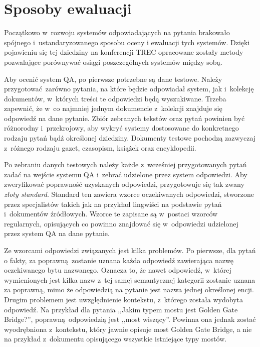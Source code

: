 \documentclass[a4paper, twoside, openright, 12pt]{report}
\begin{document}
    \section{Sposoby ewaluacji}
        Początkowo w~rozwoju systemów odpowiadających na pytania brakowało spójnego i~ustandaryzowanego sposobu oceny i
        ewaluacji tych systemów. Dzięki pojawieniu się tej dziedziny na konferencji TREC opracowane zostały metody
        pozwalające porównywać osiągi poszczególnych systemów między sobą.

        Aby ocenić system QA, po pierwsze potrzebne są dane testowe. Należy przygotować zarówno pytania, na które będzie
        odpowiadał system, jak i~kolekcję dokumentów, w~których treści te odpowiedzi będą wyszukiwane. Trzeba zapewnić,
        że w~co najmniej jednym dokumencie z~kolekcji znajduje się odpowiedź na dane pytanie. Zbiór zebranych
        tekstów oraz pytań powinien być różnorodny i~przekrojowy, aby wykryć systemy dostosowane do konkretnego
        rodzaju pytań bądź określonej dziedziny. Dokumenty testowe pochodzą zazwyczaj z~różnego rodzaju gazet, czasopism,
        książek oraz encyklopedii.

        Po zebraniu danych testowych należy każde z~wcześniej przygotowanych pytań zadać na wejście systemu QA i~zebrać
        udzielone przez system odpowiedzi. Aby zweryfikować poprawność uzyskanych odpowiedzi, przygotowuje się tak zwany
        \emph{złoty standard}. Standard ten zawiera wzorce oczekiwanych odpowiedzi, stworzone przez specjalistów takich
        jak na przykład lingwiści na podstawie pytań i~dokumentów źródłowych. Wzorce te zapisane są w~postaci wzorców
        regularnych, opisujących co powinno znajdować się w~odpowiedzi udzielonej przez system QA na dane pytanie.

        Ze wzorcami odpowiedzi związanych jest kilka problemów. Po pierwsze, dla pytań o fakty, za poprawną zostanie
        uznana każda odpowiedź zawierająca nazwę oczekiwanego bytu nazwanego. Oznacza to, że nawet odpowiedź, w~której
        wymienionych jest kilka nazw z~tej samej semantycznej kategorii zostanie uznana za poprawną, mimo że odpowiedzią
        na pytanie jest nazwa jednej określonej encji. Drugim problemem jest uwzględnienie kontekstu, z~którego została
        wydobyta odpowiedź. Na przykład dla pytania ,,Jakim typem mostu jest Golden Gate Bridge?'', poprawną odpowiedzią
        jest ,,most wiszący''. Powinna ona jednak zostać wyodrębniona z~kontekstu, który jawnie opisuje most Golden
        Gate Bridge, a nie na przykład z~dokumentu opisującego wszystkie istniejące typy mostów.
\end{document}
